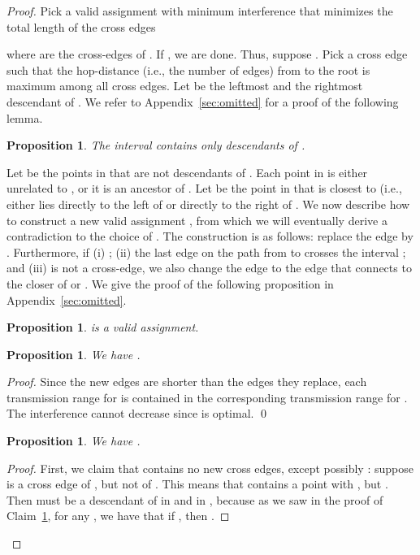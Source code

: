 \documentclass[envcountsect,envcountsame,runningheads,a4paper]{llncs}
\newtheorem{prop}[theorem]{Proposition}
\begin{document}
\begin{proof}
Pick a valid assignment
 with minimum interference that minimizes the total
length of the cross edges

where  are the cross-edges of .
If , we are done.
Thus, suppose . Pick a cross edge  such that
the hop-distance (i.e., the number of edges) from  to the root
is maximum among all cross edges.
Let  be the leftmost and  the rightmost descendant of . We refer 
to Appendix~\ref{sec:omitted} for a proof of the following lemma.

\begin{prop}\label{prop:descendants}
The interval  contains only descendants of .
\end{prop}

Let  be the points in  that
are not descendants of . Each point in 
is either unrelated to , or it is an ancestor of .
Let  be the point in  that is closest
to  (i.e.,   either lies directly to the left of  or directly
to the right of .
We now describe how to construct a new valid assignment ,
from which we will eventually derive a contradiction to the choice of
.
The construction is as follows:
replace the edge  by . Furthermore, if
(i) ;
(ii) the last edge   on the path
from  to  crosses the interval ; and (iii)
 is not a cross-edge, we also
change the edge  to the edge that connects  to the
closer of  or . We give the proof of the following proposition in Appendix~\ref{sec:omitted}.

\begin{prop}\label{clm:validass}
 is a valid assignment.
\end{prop}


\begin{prop}\label{clm:optass}
We have .
\end{prop}

\begin{proof}
Since the new edges are shorter than the edges they replace, each
transmission range for  is contained in the corresponding
transmission range for . The interference cannot decrease since  is
optimal.
\qed{}
\end{proof}

\begin{prop}\label{clm:lesscross}
We have .
\end{prop}

\begin{proof}
First, we claim that  contains
no new cross edges, except possibly :
suppose  is a cross edge
of , but not of .
This means that  contains a point 
with ,
but .
Then 
must be a descendant of  in  and in
, because
as we saw in the proof of Claim~\ref{clm:validass},
for any , we have that if ,
then .


\end{proof}
\end{proof}
\end{document}
